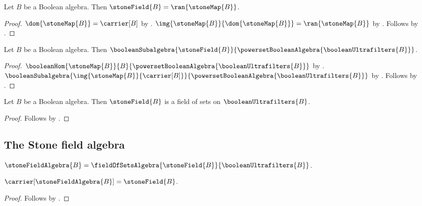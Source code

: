 \begin{proposition}\label{stone_field_eq_range}
    Let $B$ be a Boolean algebra.
    Then $\stoneField{B}=\ran{\stoneMap{B}}$.
\end{proposition}
\begin{proof}
    $\dom{\stoneMap{B}}=\carrier[B]$ by
        .
    $\img{\stoneMap{B}}{\dom{\stoneMap{B}}}
        =\ran{\stoneMap{B}}$ by .
    Follows by .
\end{proof}

\begin{theorem}\label{stone_field_is_boolean_subalgebra}
    Let $B$ be a Boolean algebra.
    Then $\booleanSubalgebra
        {\stoneField{B}}
        {\powersetBooleanAlgebra{\booleanUltrafilters{B}}}$.
\end{theorem}
\begin{proof}
    $\booleanHom
        {\stoneMap{B}}
        {B}
        {\powersetBooleanAlgebra{\booleanUltrafilters{B}}}$ by
        .
    $\booleanSubalgebra
        {\img{\stoneMap{B}}{\carrier[B]}}
        {\powersetBooleanAlgebra{\booleanUltrafilters{B}}}$ by
        .
    Follows by .
\end{proof}

\begin{classification}\label{stone_field_is_field_of_sets}
    Let $B$ be a Boolean algebra.
    Then $\stoneField{B}$ is a field of sets on
        $\booleanUltrafilters{B}$.
\end{classification}
\begin{proof}
    Follows by
        .
\end{proof}

\subsection{The Stone field algebra}

\begin{definition}\label{stone_field_algebra}
    $\stoneFieldAlgebra{B}=
        \fieldOfSetsAlgebra
            {\stoneField{B}}{\booleanUltrafilters{B}}$.
\end{definition}

\begin{proposition}\label{stone_field_algebra_carrier}
    $\carrier[\stoneFieldAlgebra{B}]=\stoneField{B}$.
\end{proposition}
\begin{proof}
    Follows by
        .
\end{proof}

